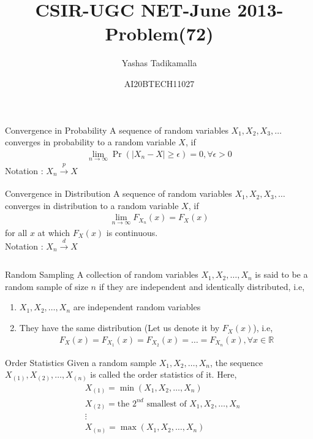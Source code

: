\documentclass{beamer}
\title{CSIR-UGC NET-June 2013-Problem(72)}
\author{Yashas Tadikamalla}
\date{AI20BTECH11027}
\providecommand{\pr}[1]{\ensuremath{\Pr\left(#1\right)}}
\providecommand{\brak}[1]{\ensuremath{\left(#1\right)}}
\begin{document}
\begin{frame}
\titlepage
\end{frame}

\begin{frame}
\frametitle{}
\begin{block}{Convergence in Probability}
A sequence of random variables $X_{1},X_{2},X_{3},\dots$ converges in probability to a random variable $X$, if
\begin{align}
    \label{eq:p}
    \displaystyle\lim_{n\to\infty}\pr{|X_{n}-X|\geq\epsilon}=0,\forall\epsilon>0
\end{align}
Notation : $X_{n}\xrightarrow[]{p}X$
\end{block}
\begin{block}{Convergence in Distribution}
A sequence of random variables $X_{1},X_{2},X_{3},\dots$ converges in distribution to a random variable $X$, if
\begin{align}
    \label{eq:d}
    \displaystyle\lim_{n\to\infty}F_{X_{n}}(x)=F_{X}(x)
\end{align}
for all $x$ at which $F_{X}(x)$ is continuous.\\
Notation : $X_{n}\xrightarrow[]{d}X$
\end{block}
\end{frame}

\begin{frame}
\frametitle{}
\begin{block}{Random Sampling}
A collection of random variables $X_{1},X_{2},\dots,X_{n}$ is said to be a random sample of size $n$ if they are independent and identically distributed, i.e,
\begin{enumerate}
    \item $X_{1},X_{2},\dots,X_{n}$ are independent random variables
    \item They have the same distribution (Let us denote it by $F_{X}(x)$), i.e,
    \begin{align}
        F_{X}(x)=F_{X_{1}}(x)=F_{X_{2}}(x)=\dots=F_{X_{n}}(x),\forall x\in \mathbb{R}
    \end{align}
\end{enumerate}
\end{block}
\begin{block}{Order Statistics}
Given a random sample $X_{1},X_{2},\dots,X_{n}$, the sequence $X_{(1)},X_{(2)},\dots,X_{(n)}$ is called the order statistics of it. Here,
\begin{align}
    &X_{(1)}=\min\brak{X_{1},X_{2},\dots,X_{n}}\\
    &X_{(2)}=\text{the }2^{nd}\text{ smallest of }X_{1},X_{2},\dots,X_{n}\\
    &\vdots\\
    &X_{(n)}=\max\brak{X_{1},X_{2},\dots,X_{n}}
\end{align}
\end{block}
\end{frame}
\end{document}
